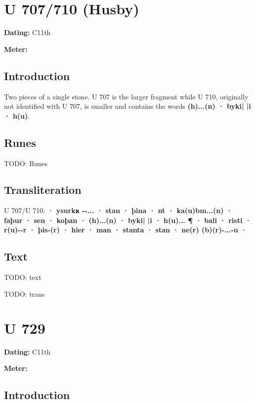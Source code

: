 \section{U 707/710 (Husby)}

\begin{flushright}%
\textbf{Dating:} C11th

\textbf{Meter:} \Fornyrdislag
\end{flushright}%

\subsection{Introduction}

Two pieces of a single stone.  U 707 is the larger fragment while U 710, originally not identified with U 707, is smaller and contains the words \textbf{(h)...(n) · byki| |i · h(u)}.

\subsection{Runes}

TODO: Runes%

\subsection{Transliteration}

U 707/U 710: \textbf{· ysurkʀ -{}-... · stan · þina · nt · ka(u)bm...(n) · faþur · sen · koþan · (h)...(n) · byki| |i · h(u)... ¶ · bali · risti · r(u)-{}-r · þis-(r) · hier · man · stanta · stan · ne(r) (b)(r)-...-u ·}

\subsection{Text}

\bpg\bpa[0]%
TODO: text\epa

\bpb TODO: trans\epb\epg

\sectionline\clearpage


\section{U 729}

\begin{flushright}%
\textbf{Dating:} C11th

\textbf{Meter:} \Fornyrdislag
\end{flushright}%

\subsection{Introduction}

